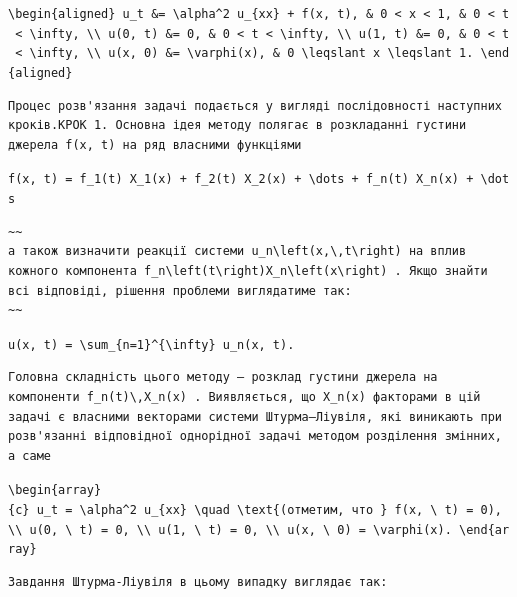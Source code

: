\documentclass[
  ukrainian,
]{article}
\begin{document}
\texttt{\textbackslash{}begin\{aligned\}\ u\_t\ \&=\ \textbackslash{}alpha\^{}2\ u\_\{xx\}\ +\ f(x,\ t),\ \&\ 0\ \textless{}\ x\ \textless{}\ 1,\ \&\ 0\ \textless{}\ t\ \textless{}\ \textbackslash{}infty,\ \textbackslash{}\textbackslash{}\ u(0,\ t)\ \&=\ 0,\ \&\ 0\ \textless{}\ t\ \textless{}\ \textbackslash{}infty,\ \textbackslash{}\textbackslash{}\ u(1,\ t)\ \&=\ 0,\ \&\ 0\ \textless{}\ t\ \textless{}\ \textbackslash{}infty,\ \textbackslash{}\textbackslash{}\ u(x,\ 0)\ \&=\ \textbackslash{}varphi(x),\ \&\ 0\ \textbackslash{}leqslant\ x\ \textbackslash{}leqslant\ 1.\ \textbackslash{}end\{aligned\}}

\begin{verbatim}
Процес розв'язання задачі подається у вигляді послідовності наступних кроків.КРОК 1. Основна ідея методу полягає в розкладанні густини джерела f(x, t) на ряд власними функціями
\end{verbatim}

\texttt{f(x,\ t)\ =\ f\_1(t)\ X\_1(x)\ +\ f\_2(t)\ X\_2(x)\ +\ \textbackslash{}dots\ +\ f\_n(t)\ X\_n(x)\ +\ \textbackslash{}dots}

\begin{verbatim}
~~
а також визначити реакції системи u_n\left(x,\,t\right) на вплив кожного компонента f_n\left(t\right)X_n\left(x\right) . Якщо знайти всі відповіді, рішення проблеми виглядатиме так:
~~
\end{verbatim}

\texttt{u(x,\ t)\ =\ \textbackslash{}sum\_\{n=1\}\^{}\{\textbackslash{}infty\}\ u\_n(x,\ t).}

\begin{verbatim}
Головна складність цього методу — розклад густини джерела на компоненти f_n(t)\,X_n(x) . Виявляється, що X_n(x) факторами в цій задачі є власними векторами системи Штурма–Ліувіля, які виникають при розв'язанні відповідної однорідної задачі методом розділення змінних, а саме
\end{verbatim}

\texttt{\textbackslash{}begin\{array\}\{c\}\ u\_t\ =\ \textbackslash{}alpha\^{}2\ u\_\{xx\}\ \textbackslash{}quad\ \textbackslash{}text\{(отметим,\ что\ \}\ f(x,\ \textbackslash{}\ t)\ =\ 0),\ \textbackslash{}\textbackslash{}\ u(0,\ \textbackslash{}\ t)\ =\ 0,\ \textbackslash{}\textbackslash{}\ u(1,\ \textbackslash{}\ t)\ =\ 0,\ \textbackslash{}\textbackslash{}\ u(x,\ \textbackslash{}\ 0)\ =\ \textbackslash{}varphi(x).\ \textbackslash{}end\{array\}}

\begin{verbatim}
Завдання Штурма-Ліувіля в цьому випадку виглядає так:
\end{verbatim}
\end{document}

